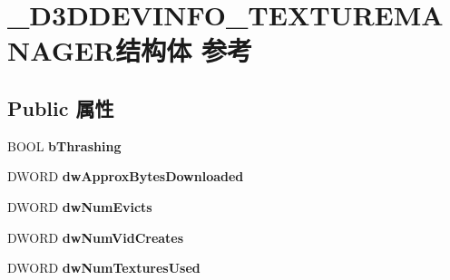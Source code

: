 \hypertarget{struct___d3_d_d_e_v_i_n_f_o___t_e_x_t_u_r_e_m_a_n_a_g_e_r}{}\section{\+\_\+\+D3\+D\+D\+E\+V\+I\+N\+F\+O\+\_\+\+T\+E\+X\+T\+U\+R\+E\+M\+A\+N\+A\+G\+E\+R结构体 参考}
\label{struct___d3_d_d_e_v_i_n_f_o___t_e_x_t_u_r_e_m_a_n_a_g_e_r}
\subsection*{Public 属性}
\begin{DoxyCompactItemize}
\item 
\mbox{\label{struct___d3_d_d_e_v_i_n_f_o___t_e_x_t_u_r_e_m_a_n_a_g_e_r_aaecc84d60c3d4dc0bd4d7fb3c147e49e}} 
B\+O\+OL {\bfseries b\+Thrashing}
\item 
\mbox{\label{struct___d3_d_d_e_v_i_n_f_o___t_e_x_t_u_r_e_m_a_n_a_g_e_r_a02d8e48bff748decbcc6f3526d1003ec}} 
D\+W\+O\+RD {\bfseries dw\+Approx\+Bytes\+Downloaded}
\item 
\mbox{\label{struct___d3_d_d_e_v_i_n_f_o___t_e_x_t_u_r_e_m_a_n_a_g_e_r_a93fca92d24d5a2a364bcb0673807b10a}} 
D\+W\+O\+RD {\bfseries dw\+Num\+Evicts}
\item 
\mbox{\label{struct___d3_d_d_e_v_i_n_f_o___t_e_x_t_u_r_e_m_a_n_a_g_e_r_ab7026a224c6ca22ad2e4ac973de0632e}} 
D\+W\+O\+RD {\bfseries dw\+Num\+Vid\+Creates}
\item 
\mbox{\label{struct___d3_d_d_e_v_i_n_f_o___t_e_x_t_u_r_e_m_a_n_a_g_e_r_a9c0ec14c29e46978a8debdf4870f6c91}} 
D\+W\+O\+RD {\bfseries dw\+Num\+Textures\+Used}
\item 
\mbox{\label{struct___d3_d_d_e_v_i_n_f_o___t_e_x_t_u_r_e_m_a_n_a_g_e_r_a8f9172f7737ad92dc6b2f7f76e684b4b}} 

\end{DoxyCompactItemize}
